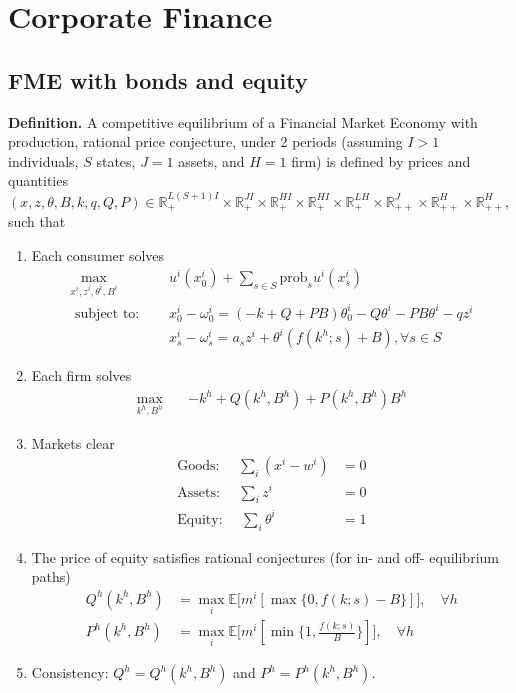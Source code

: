 \section{Corporate Finance}
\subsection{FME with bonds and equity}
\noindent \textbf{Definition.} 
A competitive equilibrium of a Financial Market Economy with production, rational price conjecture, 
under 2 periods (assuming $I > 1$ individuals, 
$S$ states,  
$J = 1$ assets, and $H =1$ firm) is 
defined by 
prices and quantities 
$(x, z, \theta, B, k, q, Q, P) \in 
\mathbb{R}^{L(S+1)I}_{+} \times \mathbb{R}^{JI}_{+} \times \mathbb{R}^{HI}_{+} \times \mathbb{R}^{HI}_{+} 
\times \mathbb{R}^{LH}_{+} \times \mathbb{R}^{J}_{++} \times \mathbb{R}^{H}_{++} \times \mathbb{R}^{H}_{++}$, such that 
\begin{enumerate}
    \item Each consumer solves 
    \begin{align*}
        \max_{x^i, z^i, \theta^i, B^i} \quad & u^i(x^i_0) + \sum_{s \in S} \text{prob}_s u^i(x^i_s) \\
        \text{ subject to: } \quad &  x^i_0 - \omega^i_0 =  \left(-k + Q + P B \right) \theta^i_0 - Q \theta^i - P B \theta^i - q z^i \\
        & x^i_s - \omega^i_s = a_s z^i +  \theta^i (f(k^h;s) + B), \forall s \in S
    \end{align*}
    \item Each firm solves 
    \begin{align*}
        \max_{k^h, B^h} \quad & -k^h + Q(k^h, B^h) + P(k^h, B^h) B^h
    \end{align*}
    \item Markets clear 
    \begin{align*}
        \text{Goods: } \quad \sum_i (x^i - w^i) & = 0 \\
        \text{Assets: } \quad \sum_i z^i & = 0 \\
        \text{Equity: } \quad \sum_i \theta^i & = 1 
    \end{align*}
    \item The price of equity satisfies rational conjectures (for in- and off- equilibrium paths)
    \begin{align*}
    Q^h (k^h, B^h) & = \max_i \mathbb{E}\bigg[m^i [\max\{0, f(k;s) - B \}] \bigg], \quad \forall h \\
    P^h (k^h, B^h) & = \max_i \mathbb{E}\bigg[m^i [\min \{1, \frac{f(k;s)}{B} \}] \bigg], \quad \forall h
    \end{align*}
    \item Consistency: $Q^h = Q^h(k^h, B^h)$ and  $P^h = P^h(k^h, B^h)$.
\end{enumerate}

